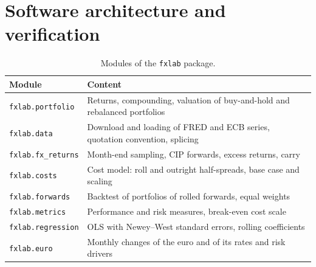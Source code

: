 \section{Software architecture and verification}\label{app:software}

\begin{table}[h]
\centering
\small
\begin{tabular}{@{}ll@{}}
\toprule
Module & Content \\
\midrule
\texttt{fxlab.portfolio} & Returns, compounding, valuation of buy-and-hold and rebalanced portfolios \\
\texttt{fxlab.data} & Download and loading of FRED and ECB series, quotation convention, splicing \\
\texttt{fxlab.fx\_returns} & Month-end sampling, CIP forwards, excess returns, carry \\
\texttt{fxlab.costs} & Cost model: roll and outright half-spreads, base case and scaling \\
\texttt{fxlab.forwards} & Backtest of portfolios of rolled forwards, equal weights \\
\texttt{fxlab.metrics} & Performance and risk measures, break-even cost scale \\
\texttt{fxlab.regression} & OLS with Newey--West standard errors, rolling coefficients \\
\texttt{fxlab.euro} & Monthly changes of the euro and of its rates and risk drivers \\
\bottomrule
\end{tabular}
\caption{Modules of the \texttt{fxlab} package.}
\end{table}

